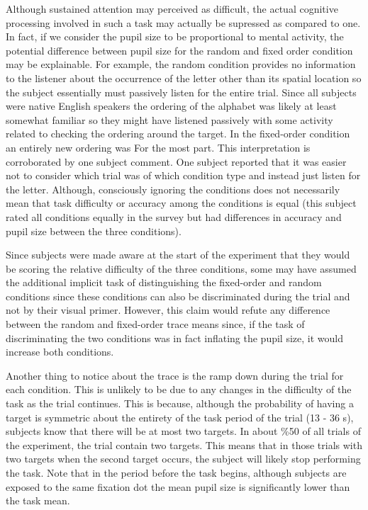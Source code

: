 \documentclass[12pt]{article}
\begin{document}
Although sustained
attention may perceived as difficult, the actual cognitive
processing involved in such a task may actually be supressed as
compared to one.  In fact, if we consider the pupil size to be
proportional to mental activity, the potential difference between
pupil size for the random and fixed order condition may be
explainable.  For example, the random condition provides no
information to the listener about the occurrence of the letter other
than its spatial location so the subject essentially must passively
listen for the entire trial.  Since all subjects were native English
speakers the ordering of the alphabet was likely at least somewhat
familiar so they might have listened passively with some activity
related to checking the ordering around the target.  In the
fixed-order condition an entirely new ordering was For the most
part.  This interpretation is corroborated by one subject comment.
One subject reported that it was easier not to consider which trial
was of which condition type and instead just listen for the letter.
Although, consciously ignoring the conditions does not necessarily
mean that task difficulty or accuracy among the conditions is equal
(this subject rated all conditions equally in the survey but had
differences in accuracy and pupil size between the three
conditions).

Since subjects were made aware at the start of the experiment that
they would be scoring the relative difficulty of the three
conditions, some may have assumed the additional implicit task of
distinguishing the fixed-order and random conditions since these
conditions can also be discriminated during the trial and not by
their visual primer.  However, this claim would refute any
difference between the random and fixed-order trace means since, if
the task of discriminating the two conditions was in fact inflating
the pupil size, it would increase both conditions. 

Another thing to notice about the trace is the ramp down during the
trial for each condition.  This is unlikely to be due to any changes in
the difficulty of the task as the trial continues. This is because, although
the probability of having a target is symmetric about the entirety of
the task period of the trial (13 - 36 s), subjects know that there will be at
most two targets.  In about \%50 of all trials of
the experiment, the trial contain two targets. This means that 
in those trials with two targets when the second target occurs, the subject will likely stop
performing the task.  Note that in the period before the task
begins, although subjects are exposed to the same fixation dot the
mean pupil size is significantly lower than the task mean.
\end{document}
